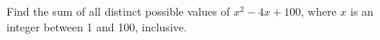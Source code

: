 Find the sum of all distinct possible values of $x^2-4x+100$, where $x$ is an integer between 1 and 100, inclusive.
